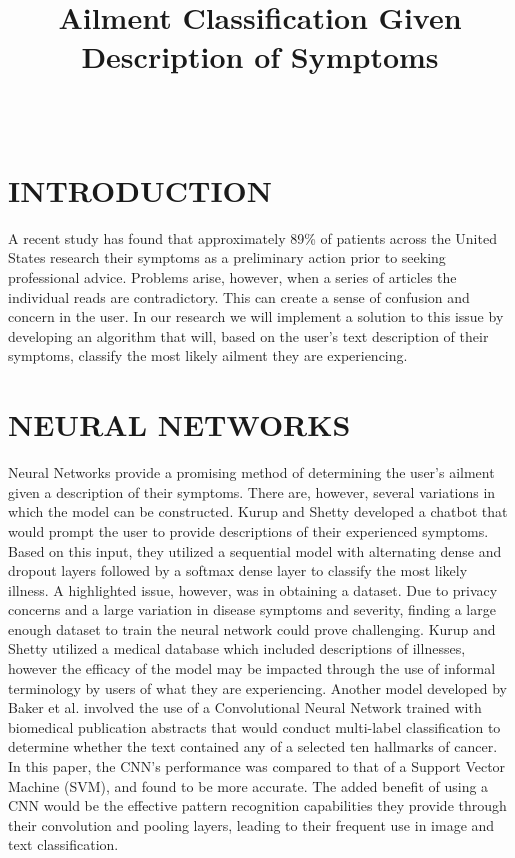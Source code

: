 \documentclass[12pt, final, onecolumn, comsoc, conference]{IEEEtran}
\begin{document}
\title{Ailment Classification Given Description of Symptoms}
\author{
	\\
}

\maketitle
\section{\MakeTextUppercase{Introduction}}
A recent study has found that approximately 89\% of patients across the United States
research their symptoms as a preliminary action prior to seeking professional advice.
Problems arise, however, when a series of articles the individual reads are contradictory.
This can create a sense of confusion and concern in the user.
In our research we will implement a solution to this issue by developing an algorithm that will,
based on the user's text description of their symptoms, classify the most likely ailment
they are experiencing.

\section{\MakeTextUppercase{Neural Networks}}
Neural Networks provide a promising method of determining the user’s ailment given a description of their symptoms.
There are, however, several variations in which the model can be constructed.
Kurup and Shetty developed a chatbot that would prompt the user to provide descriptions of their experienced symptoms.
Based on this input, they utilized a sequential model with alternating dense and dropout layers followed by a softmax dense layer to classify the most likely illness.
A highlighted issue, however, was in obtaining a dataset.
Due to privacy concerns and a large variation in disease symptoms and severity, finding a large enough dataset to train the neural network could prove challenging.
Kurup and Shetty utilized a medical database which included descriptions of illnesses, however the efficacy of the model may be impacted through the use of informal terminology by users of what they are experiencing.
Another model developed by Baker et al. involved the use of a Convolutional Neural Network trained with biomedical publication abstracts that would conduct multi-label classification to determine whether the text contained any of a selected ten hallmarks of cancer.
In this paper, the CNN’s performance was compared to that of a Support Vector Machine (SVM), and found to be more accurate.
The added benefit of using a CNN would be the effective pattern recognition capabilities they provide through their convolution and pooling layers, leading to their frequent use in image and text classification.
\end{document}
